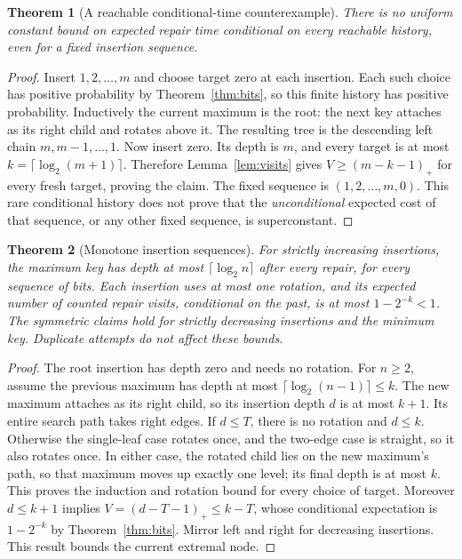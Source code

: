 \documentclass[11pt]{article}
\newtheorem{theorem}{Theorem}
\newcommand{\pos}[1]{\left(#1\right)_{+}}
\begin{document}
\begin{theorem}[A reachable conditional-time counterexample]\label{thm:chain}
There is no uniform constant bound on expected repair time conditional on every
reachable history, even for a fixed insertion sequence.
\end{theorem}
\begin{proof}
Insert $1,2,\ldots,m$ and choose target zero at each insertion. Each such
choice has positive probability by Theorem~\ref{thm:bits}, so this finite
history has positive probability. Inductively the current maximum is the root:
the next key attaches as its right child and rotates above it. The resulting
tree is the descending left chain $m,m-1,\ldots,1$. Now insert zero. Its depth
is $m$, and every target is at most $k=\lceil\log_2(m+1)\rceil$. Therefore
Lemma~\ref{lem:visits} gives
$V\geq\pos{m-k-1}$ for every fresh target, proving the claim. The fixed
sequence is $(1,2,\ldots,m,0)$. This rare conditional history does not prove
that the \emph{unconditional} expected cost of that sequence, or any other
fixed sequence, is superconstant.
\end{proof}

\begin{theorem}[Monotone insertion sequences]\label{thm:monotone}
For strictly increasing insertions, the maximum key has depth at most
$\lceil\log_2 n\rceil$ after every repair, for every sequence of bits. Each
insertion uses at most one rotation, and its expected number of counted repair
visits, conditional on the past, is at most $1-2^{-k}<1$. The symmetric claims
hold for strictly decreasing insertions and the minimum key. Duplicate attempts
do not affect these bounds.
\end{theorem}
\begin{proof}
The root insertion has depth zero and needs no rotation. For $n\geq2$, assume
the previous maximum has depth at most $\lceil\log_2(n-1)\rceil\leq k$.
The new maximum attaches as its right child, so its insertion depth $d$ is at
most $k+1$. Its entire search path takes right edges. If $d\leq T$, there is no
rotation and $d\leq k$. Otherwise the single-leaf case rotates once, and the
two-edge case is straight, so it also rotates once. In either case, the rotated
child lies on the new maximum's path, so that maximum moves up exactly one
level; its final depth is at most $k$. This proves the induction and rotation
bound for every choice of target. Moreover $d\leq k+1$ implies
$V=\pos{d-T-1}\leq k-T$, whose conditional expectation is $1-2^{-k}$ by
Theorem~\ref{thm:bits}. Mirror left and right for decreasing insertions. This
result bounds the current extremal node.
\end{proof}
\end{document}
